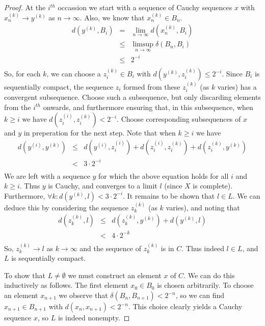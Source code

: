 \documentclass[a4paper,11pt]{article}
\begin{document}
\begin{proof}
At the $i^{th}$ occassion we start with a sequence of Cauchy sequences $x$ with
$x^{(k)}_n\to y^{(k)}$ as $n\to\infty$.  Also, we know that $x^{(k)}_n\in B_n$.
%
\begin{eqnarray*}
d(y^{(k)},B_i)
  &=& \lim_{n\to\infty}d(x^{(k)}_n,B_i) \\
  &\leq& \limsup_{n\to\infty}\delta(B_n,B_i) \\
  &\leq& 2^{-i} \\
\end{eqnarray*}
%
So, for each $k$, we can choose a $z_i^{(k)}\in B_i$ with
$d(y^{(k)},z_i^{(k)})\leq2^{-i}$.  Since $B_i$ is sequentially compact, the
sequence $z_i$ formed from these $z_i^{(k)}$
(as $k$ varies) has a convergent subsequence.  Choose
such a subsequence, but only discarding elements from the $i^{th}$ onwards, and
furthermore ensuring that, in this subsequence, when $k\geq i$ we have
$d(z_i^{(i)},z_i^{(k)})<2^{-i}$.  
Choose corresponding subsequences of $x$ and $y$ in preperation for the next
step.  Note that when $k\geq i$ we have
%
\begin{eqnarray*}
d(y^{(i)},y^{(k)})
  &\leq& d(y^{(i)},z_i^{(i)})+d(z_i^{(i)},z_i^{(k)})+d(z_i^{(k)},y^{(k)}) \\
  &<& 3\cdot2^{-i} \\
\end{eqnarray*}
%
We are left with a sequence $y$ for which the above equation holds for all $i$
and $k\geq i$.  Thus $y$ is Cauchy, and converges to
a limit $l$ (since $X$ is complete).  Furthermore,
$\forall k:d(y^{(k)},l)<3\cdot 2^{-i}$.  It
remains to be shown that $l\in L$.  We can deduce this by considering the
sequence $z_k^{(k)}$ (as $k$ varies), and noting that
%
\begin{eqnarray*}
d(z_k^{(k)},l)
  &\leq& d(z_k^{(k)},y^{(k)})+d(y^{(k)},l) \\
  &<& 4\cdot2^{-k} \\
\end{eqnarray*}
%
So, $z_k^{(k)}\to l$ as $k\to\infty$ and the sequence of $z_k^{(k)}$ is in $C$.
Thus indeed $l\in L$, and $L$ is sequentially compact.

To show that $L\not=\emptyset$ we must construct an
element $x$ of $C$.  We can do this
inductively as follows.  The first element $x_0\in B_0$ is chosen arbitrarily.
To choose an element $x_{n+1}$ we observe that $\delta(B_n,B_{n+1})<2^{-n}$, so
we can find $x_{n+1}\in B_{n+1}$ with $d(x_n,x_{n+1})<2^{-n}$.  This choice
clearly yields a Cauchy sequence $x$, so $L$ is indeed nonempty.


\end{proof}
\end{document}
